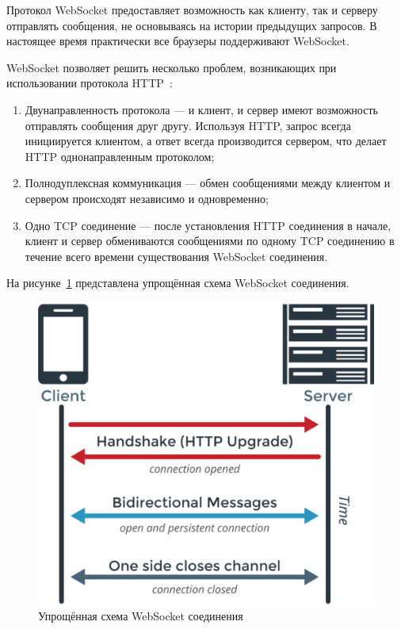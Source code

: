 Протокол WebSocket предоставляет возможность как клиенту, так и серверу отправлять сообщения, не основываясь на истории предыдущих запросов. В настоящее время практически все браузеры поддерживают WebSocket.

WebSocket позволяет решить несколько проблем, возникающих при использовании протокола HTTP~\cite{http_websockets}:

\begin{enumerate}
  \item Двунаправленность протокола --- и клиент, и сервер имеют возможность отправлять сообщения друг другу. Используя HTTP, запрос всегда инициируется клиентом, а ответ всегда производится сервером, что делает HTTP однонаправленным протоколом;
  \item Полнодуплексная коммуникация --- обмен сообщениями между клиентом и сервером происходят независимо и одновременно;
  \item Одно TCP соединение --- после установления HTTP соединения в начале, клиент и сервер обмениваются сообщениями по одному TCP соединению в течение всего времени существования WebSocket соединения. 
\end{enumerate}

На рисунке~\ref{img:webSocket__schema} представлена упрощённая схема WebSocket соединения.

\begin{figure}[H]
  \centering
  \includegraphics[height=0.2\textheight]{assets/images/theoretical2/webSocket_schema.png}
  \caption{Упрощённая схема WebSocket соединения}
  \label{img:webSocket__schema}
\end{figure}

